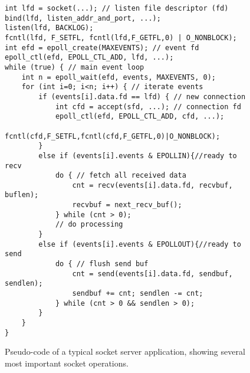 \begin{figure}
\begin{lstlisting}[style=CStyle]
int lfd = socket(...); // listen file descriptor (fd)
bind(lfd, listen_addr_and_port, ...);
listen(lfd, BACKLOG);
fcntl(lfd, F_SETFL, fcntl(lfd,F_GETFL,0) | O_NONBLOCK);
int efd = epoll_create(MAXEVENTS); // event fd
epoll_ctl(efd, EPOLL_CTL_ADD, lfd, ...);
while (true) { // main event loop
	int n = epoll_wait(efd, events, MAXEVENTS, 0);
	for (int i=0; i<n; i++) { // iterate events
		if (events[i].data.fd == lfd) { // new connection
			int cfd = accept(sfd, ...); // connection fd
			epoll_ctl(efd, EPOLL_CTL_ADD, cfd, ...);
			fcntl(cfd,F_SETFL,fcntl(cfd,F_GETFL,0)|O_NONBLOCK);
		}
		else if (events[i].events & EPOLLIN){//ready to recv
			do { // fetch all received data
				cnt = recv(events[i].data.fd, recvbuf, buflen);
				recvbuf = next_recv_buf();
			} while (cnt > 0);
			// do processing
		}
		else if (events[i].events & EPOLLOUT){//ready to send
			do { // flush send buf
				cnt = send(events[i].data.fd, sendbuf, sendlen);
				sendbuf += cnt; sendlen -= cnt;
			} while (cnt > 0 && sendlen > 0);
		}
	}
}
\end{lstlisting}
\vspace{-15pt}
\caption{Pseudo-code of a typical socket server application, showing several most important socket operations.}
\label{fig:socket-pseudo-code}
\vspace{-10pt}
\end{figure}



